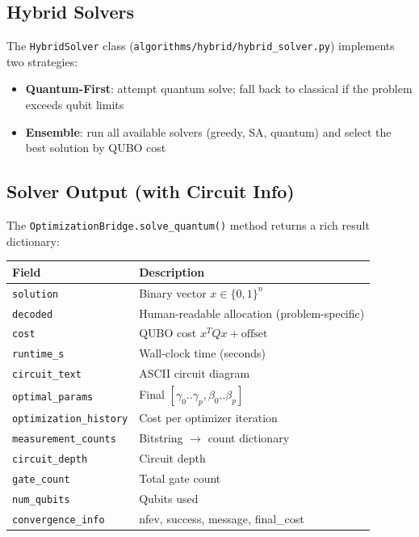 \documentclass[11pt,a4paper]{article}
\begin{document}
\subsection{Hybrid Solvers}

The \texttt{HybridSolver} class (\texttt{algorithms/hybrid/hybrid\_solver.py}) implements two strategies:

\begin{itemize}
  \item \textbf{Quantum-First}: attempt quantum solve; fall back to classical if the problem exceeds qubit limits
  \item \textbf{Ensemble}: run all available solvers (greedy, SA, quantum) and select the best solution by QUBO cost
\end{itemize}

\subsection{Solver Output (with Circuit Info)}

The \texttt{OptimizationBridge.solve\_quantum()} method returns a rich result dictionary:

\begin{center}
\begin{tabularx}{\textwidth}{lX}
  \toprule
  \textbf{Field} & \textbf{Description} \\
  \midrule
  \texttt{solution} & Binary vector $x \in \{0,1\}^n$ \\
  \texttt{decoded} & Human-readable allocation (problem-specific) \\
  \texttt{cost} & QUBO cost $x^T Q x + \text{offset}$ \\
  \texttt{runtime\_s} & Wall-clock time (seconds) \\
  \texttt{circuit\_text} & ASCII circuit diagram \\
  \texttt{optimal\_params} & Final $[\gamma_0..\gamma_p, \beta_0..\beta_p]$ \\
  \texttt{optimization\_history} & Cost per optimizer iteration \\
  \texttt{measurement\_counts} & Bitstring $\to$ count dictionary \\
  \texttt{circuit\_depth} & Circuit depth \\
  \texttt{gate\_count} & Total gate count \\
  \texttt{num\_qubits} & Qubits used \\
  \texttt{convergence\_info} & nfev, success, message, final\_cost \\
  \bottomrule
\end{tabularx}
\end{center}
\end{document}
